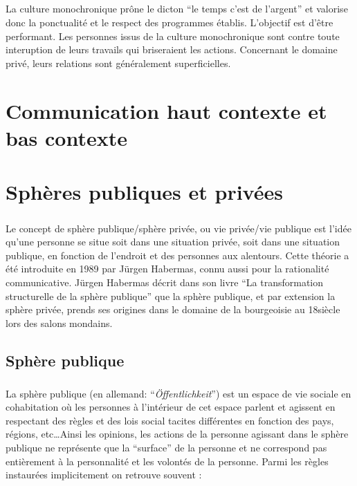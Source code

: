 \paragraph{} La culture monochronique prône le dicton ``le temps c'est de
l'argent'' et valorise donc la ponctualité et le respect des programmes
établis. L'objectif est d'être performant. Les personnes issus de la culture
monochronique sont contre toute interuption de leurs travails qui briseraient
les actions. Concernant le domaine privé, leurs relations sont généralement
superficielles.

\chapter{Communication haut contexte et bas contexte}

\chapter{Sphères publiques et privées}

\paragraph{} Le concept de sphère publique/sphère privée, ou vie privée/vie
publique est l'idée qu'une personne se situe soit dans une situation privée,
soit dans une situation publique, en fonction de l'endroit et des personnes aux
alentours. Cette théorie a été introduite en 1989 par Jürgen Habermas, connu
aussi pour la rationalité communicative. Jürgen Habermas décrit dans son livre
``La transformation structurelle de la sphère publique'' que la sphère
publique, et par extension la sphère privée, prends ses origines dans le
domaine de la bourgeoisie au 18\ieme{}siècle lors des salons mondains.

\section{Sphère publique}

\paragraph{} La sphère publique (en allemand: ``\textit{Öffentlichkeit}'') est
un espace de vie sociale en cohabitation où les personnes à l'intérieur de cet
espace parlent et agissent en respectant des règles et des lois social tacites
différentes en fonction des pays, régions, etc\ldots Ainsi les opinions, les
actions de la personne agissant dans le sphère publique ne représente que la
``surface'' de la personne et ne correspond pas entièrement à la personnalité
et les volontés de la personne. Parmi les règles instaurées implicitement on
retrouve souvent :

